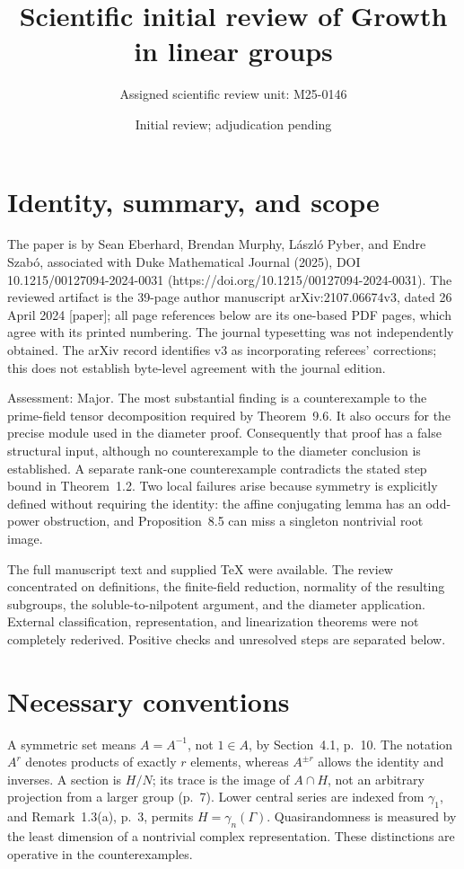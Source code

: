 \documentclass[10pt]{article}
\title{Scientific initial review of
Growth in linear groups}
\author{Assigned scientific review unit: M25-0146}
\date{Initial review; adjudication pending}
\begin{document}
\maketitle
\section*{Identity, summary, and scope}
The paper is by Sean Eberhard, Brendan Murphy, László Pyber, and Endre Szabó, associated with Duke Mathematical Journal (2025), DOI 10.1215/00127094-2024-0031 (https://doi.org/10.1215/00127094-2024-0031). The reviewed artifact is the 39-page author manuscript arXiv:2107.06674v3, dated 26 April 2024 [paper]; all page references below are its one-based PDF pages, which agree with its printed numbering. The journal typesetting was not independently obtained. The arXiv record identifies v3 as incorporating referees’ corrections; this does not establish byte-level agreement with the journal edition.\par
Assessment: Major. The most substantial finding is a counterexample to the prime-field tensor decomposition required by Theorem 9.6. It also occurs for the precise module used in the diameter proof. Consequently that proof has a false structural input, although no counterexample to the diameter conclusion is established. A separate rank-one counterexample contradicts the stated step bound in Theorem 1.2. Two local failures arise because symmetry is explicitly defined without requiring the identity: the affine conjugating lemma has an odd-power obstruction, and Proposition 8.5 can miss a singleton nontrivial root image.\par
The full manuscript text and supplied TeX were available. The review concentrated on definitions, the finite-field reduction, normality of the resulting subgroups, the soluble-to-nilpotent argument, and the diameter application. External classification, representation, and linearization theorems were not completely rederived. Positive checks and unresolved steps are separated below.\par
\section*{Necessary conventions}
A symmetric set means \(A=A^{-1}\), not \(1\in A\), by Section 4.1, p. 10. The notation \(A^r\) denotes products of exactly \(r\) elements, whereas \(A^{\pm r}\) allows the identity and inverses. A section is \(H/N\); its trace is the image of \(A\cap H\), not an arbitrary projection from a larger group (p. 7). Lower central series are indexed from \(\gamma_1\), and Remark 1.3(a), p. 3, permits \(H=\gamma_n(\Gamma)\). Quasirandomness is measured by the least dimension of a nontrivial complex representation. These distinctions are operative in the counterexamples.\par
\end{document}
